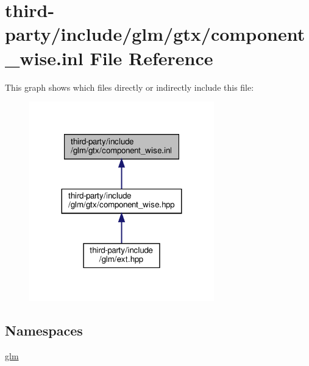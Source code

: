 \hypertarget{component__wise_8inl}{}\section{third-\/party/include/glm/gtx/component\+\_\+wise.inl File Reference}
\label{component__wise_8inl}
This graph shows which files directly or indirectly include this file\+:
\nopagebreak
\begin{figure}[H]
\begin{center}
\leavevmode
\includegraphics[width=227pt]{component__wise_8inl__dep__incl}
\end{center}
\end{figure}
\subsection*{Namespaces}
\begin{DoxyCompactItemize}
\item 
 \hyperlink{namespaceglm}{glm}
\end{DoxyCompactItemize}
